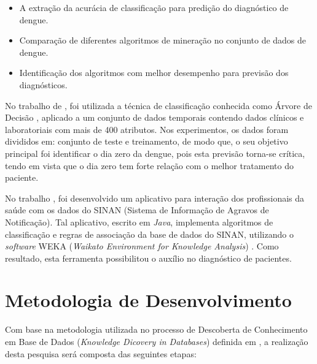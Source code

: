 \documentclass[
	12pt,				%
	openright,			%
	oneside,	
	a4paper,				%
	english,				%
	brazil				%
]{abntex2/abntex2} %
\begin{document}
	\begin{itemize}
		\item A extração da acurácia de classificação para predição do diagnóstico de dengue.
		\item Comparação de diferentes algoritmos de mineração no conjunto de dados de dengue.
		\item Identificação dos algoritmos com melhor desempenho para previsão dos diagnósticos.
	\end{itemize}
	
	No trabalho de \cite{thitiprayoonwongse:2012}, foi utilizada a técnica de classificação conhecida como Árvore de Decisão \cite{tan:2009}, aplicado a um conjunto de dados temporais contendo dados clínicos e laboratoriais com mais de 400 atributos. Nos experimentos, os dados foram divididos em: conjunto de teste e treinamento, de modo que, o seu objetivo principal foi identificar o dia zero da dengue, pois esta previsão torna-se crítica, tendo em vista que o dia zero tem forte relação com o melhor tratamento do paciente.
	
	No trabalho \cite{santos:2011}, foi desenvolvido um aplicativo para interação dos profissionais da saúde com os dados do SINAN (Sistema de Informação de Agravos de Notificação). Tal aplicativo, escrito em  \textit{Java}\cite{oracle:2015}, implementa algoritmos de classificação e regras de associação da base de dados do SINAN, utilizando o \textit{software} WEKA (\textit{Waikato Environment for Knowledge Analysis}) \cite{weka:2015}. Como resultado, esta ferramenta possibilitou o auxílio no diagnóstico de pacientes.	

	\section{Metodologia de Desenvolvimento}
		
		Com base na metodologia utilizada no processo de Descoberta de Conhecimento em Base de Dados (\textit{Knowledge Dicovery in Databases}) definida em \cite{fayyad:1996}, a realização desta pesquisa será composta das seguintes etapas:
		
\end{document}
